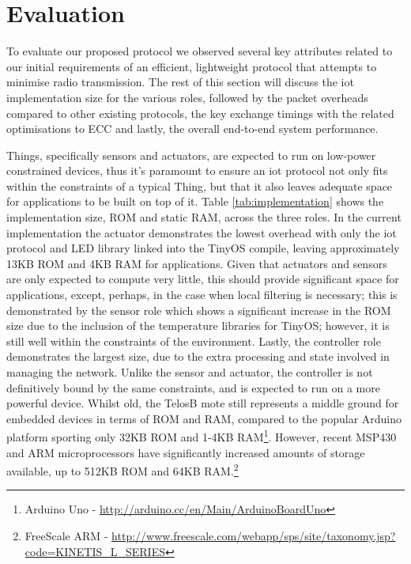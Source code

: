 \documentclass{mpaper}
\begin{document}
\section{Evaluation} %
\label{sec:evaluation}
To evaluate our proposed protocol we observed several key attributes related to our initial requirements of an efficient, lightweight protocol that attempts to minimise radio transmission. The rest of this section will discuss the iot implementation size for the various roles, followed by the packet overheads compared to other existing protocols, the key exchange timings with the related optimisations to ECC and lastly, the overall end-to-end system performance.

Things, specifically sensors and actuators, are expected to run on low-power constrained devices, thus it's paramount to ensure an iot protocol not only fits within the constraints of a typical Thing, but that it also leaves adequate space for applications to be built on top of it. Table \ref{tab:implementation} shows the implementation size, ROM and static RAM, across the three roles. In the current implementation the actuator demonstrates the lowest overhead with only the iot protocol and LED library linked into the TinyOS compile, leaving approximately 13KB ROM and 4KB RAM for applications. Given that actuators and sensors are only expected to compute very little, this should provide significant space for applications, except, perhaps, in the case when local filtering is necessary; this is demonstrated by the sensor role which shows a significant increase in the ROM size due to the inclusion of the temperature libraries for TinyOS; however, it is still well within the constraints of the environment. Lastly, the controller role demonstrates the largest size, due to the extra processing and state involved in managing the network. Unlike the sensor and actuator, the controller is not definitively bound by the same constraints, and is expected to run on a more powerful device. Whilst old, the TelosB mote still represents a middle ground for embedded devices in terms of ROM and RAM, compared to the popular Arduino platform sporting only 32KB ROM and 1-4KB RAM\footnote{Arduino Uno - \url{http://arduino.cc/en/Main/ArduinoBoardUno}}. However, recent MSP430 and ARM microprocessors have significantly increased amounts of storage available, up to 512KB ROM and 64KB RAM.\footnote{FreeScale ARM - \url{http://www.freescale.com/webapp/sps/site/taxonomy.jsp?code=KINETIS_L_SERIES}}
\end{document}
